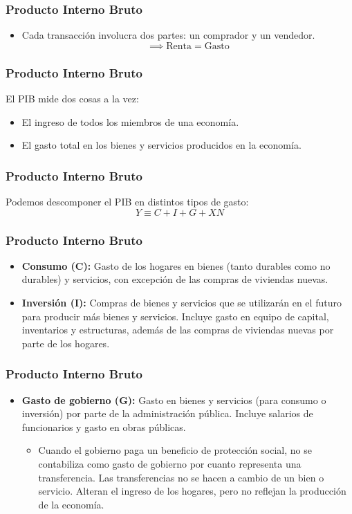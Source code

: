 \documentclass[dvipsnames,table,leqno]{beamer}
\begin{document}
		\begin{frame}
			\frametitle{Producto Interno Bruto}
			\begin{itemize}
				\item Cada transacción involucra dos partes: un comprador y un vendedor. $$\implies\text{Renta}=\text{Gasto}$$
			\end{itemize}
		\end{frame}

		\begin{frame}
			\frametitle{Producto Interno Bruto}
			El PIB mide dos cosas a la vez:
			\begin{itemize}
				\item El ingreso de todos los miembros de una economía.
				\item El gasto total en los bienes y servicios producidos en la economía.
			\end{itemize}
		\end{frame}

		\begin{frame}
			\frametitle{Producto Interno Bruto}
			Podemos descomponer el PIB en distintos tipos de gasto: $$Y\equiv C+I+G+XN$$
		\end{frame}

		\begin{frame}
			\frametitle{Producto Interno Bruto}
			\begin{itemize}
				\item \textbf{Consumo ($\mathbf{C}$):} Gasto de los hogares en bienes (tanto durables como no durables) y servicios, con excepción de las compras de viviendas nuevas.
				\item \textbf{Inversión ($\mathbf{I}$):} Compras de bienes y servicios que se utilizarán en el futuro para producir más bienes y servicios. Incluye gasto en equipo de capital, inventarios y estructuras, además de las compras de viviendas nuevas por parte de los hogares.
			\end{itemize}
		\end{frame}

		\begin{frame}
			\frametitle{Producto Interno Bruto}
			\begin{itemize}
				\item \textbf{Gasto de gobierno ($\mathbf{G}$):} Gasto en bienes y servicios (para consumo o inversión) por parte de la administración pública. Incluye salarios de funcionarios y gasto en obras públicas.
					\begin{itemize}
						\item Cuando el gobierno paga un beneficio de protección social, no se contabiliza como gasto de gobierno por cuanto representa una transferencia. Las transferencias no se hacen a cambio de un bien o servicio. Alteran el ingreso de los hogares, pero no reflejan la producción de la economía.
					\end{itemize}
			\end{itemize}
		\end{frame}
\end{document}
